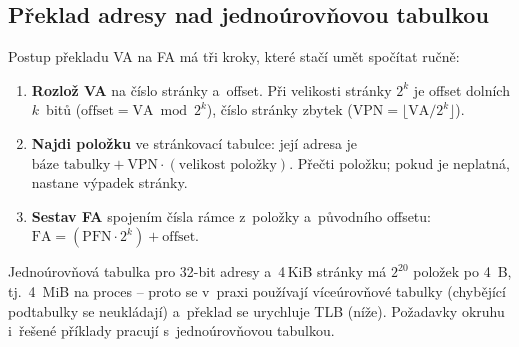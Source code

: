 \subsection{Překlad adresy nad jednoúrovňovou tabulkou}

Postup překladu VA na FA má tři kroky, které stačí umět spočítat ručně:
\begin{enumerate}
\item \textbf{Rozlož VA} na číslo stránky a~offset. Při velikosti stránky $2^{k}$ je offset dolních $k$~bitů ($\text{offset}=\text{VA}\bmod 2^{k}$), číslo stránky zbytek ($\text{VPN}=\lfloor\text{VA}/2^{k}\rfloor$).
\item \textbf{Najdi položku} ve stránkovací tabulce: její adresa je $\text{báze tabulky}+\text{VPN}\cdot(\text{velikost položky})$. Přečti položku; pokud je neplatná, nastane výpadek stránky.
\item \textbf{Sestav FA} spojením čísla rámce z~položky a~původního offsetu: $\text{FA}=(\text{PFN}\cdot 2^{k})+\text{offset}$.
\end{enumerate}

\begin{poznamka}
Jednoúrovňová tabulka pro 32-bit adresy a~4\,KiB stránky má $2^{20}$ položek po 4~B, tj.\ 4~MiB na proces -- proto se v~praxi používají víceúrovňové tabulky (chybějící podtabulky se neukládají) a~překlad se urychluje TLB (níže). Požadavky okruhu i~řešené příklady pracují s~jednoúrovňovou tabulkou.
\end{poznamka}


